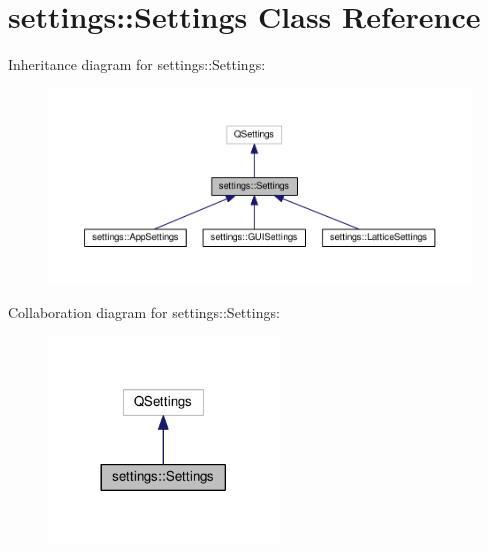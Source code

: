 \hypertarget{classsettings_1_1Settings}{}\section{settings\+:\+:Settings Class Reference}
\label{classsettings_1_1Settings}


Inheritance diagram for settings\+:\+:Settings\+:\nopagebreak
\begin{figure}[H]
\begin{center}
\leavevmode
\includegraphics[width=350pt]{classsettings_1_1Settings__inherit__graph}
\end{center}
\end{figure}


Collaboration diagram for settings\+:\+:Settings\+:\nopagebreak
\begin{figure}[H]
\begin{center}
\leavevmode
\includegraphics[width=173pt]{classsettings_1_1Settings__coll__graph}
\end{center}
\end{figure}
